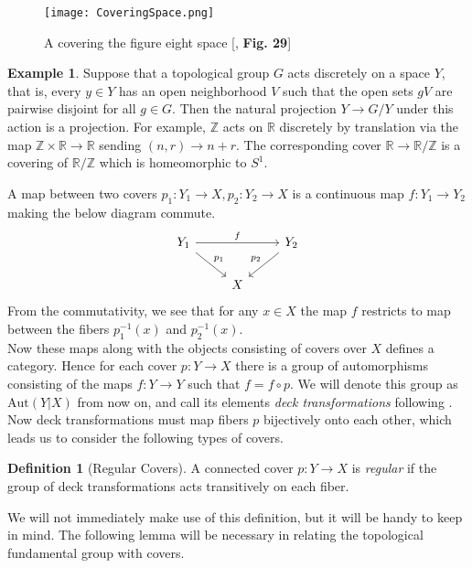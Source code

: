 \documentclass{article}
\theoremstyle{definition}
\newtheorem{definition}[theorem]{Definition}
\newtheorem{example}[theorem]{Example}
\theoremstyle{remark}
\theoremstyle{plain}
\newcommand{\R}{\mathbb{R}}
\newcommand{\Z}{\mathbb{Z}}
\begin{document}
\begin{figure}[ht!]
\centering
\texttt{[image: CoveringSpace.png]}

\caption*{A covering the figure eight space [\cite{FomenkoFuchs}, \textbf{Fig. 29}]}
\end{figure}

\begin{example} Suppose that a topological group $G$ acts discretely on a space $Y$, that is, every $y \in Y$ has an open neighborhood $V$ such that the open sets $gV$ are pairwise disjoint for all $g  \in G$.
	Then the natural projection $Y \to G/Y$ under this action is a projection.
	For example, $\Z$ acts on $\R$ discretely by translation via the map $\Z \times \R \to \R$ sending $(n,r) \to n+r$.
	The corresponding cover $\R \to \R/\Z$ is a covering of $\R/\Z$ which is homeomorphic to $S^1$.
\end{example}

\indent A map between two covers $p_1: Y_1 \to X, p_2: Y_2 \to X$ is a continuous map $f: Y_1 \to Y_2$ making the below diagram commute.
\[\begin{tikzcd}
	{Y_1} && {Y_2} \\
	& X
	\arrow["f", from=1-1, to=1-3]
	\arrow["{p_1}", from=1-1, to=2-2]
	\arrow["{p_2}"', from=1-3, to=2-2]
\end{tikzcd}\]
From the commutativity, we see that for any $x \in X$ the map $f$ restricts to map between the fibers $p_1^{-1}(x)$ and $p_2^{-1}(x)$.\\
\indent Now these maps along with the objects consisting of covers over $X$ defines a category.
Hence for each cover $p:Y \to X$ there is a group of automorphisms consisting of the maps $f: Y \to Y$ such that $f = f \circ p$.
We will denote this group as $\text{Aut}(Y|X)$ from now on, and call its elements \textit{deck transformations} following \cite{FomenkoFuchs}.
Now deck transformations must map fibers $p$ bijectively onto each other, which leads us to consider the following types of covers.

\begin{definition}[Regular Covers]
	A connected cover $p: Y \to X$ is \textit{regular} if the group of deck transformations acts transitively on each fiber.
\end{definition}

We will not immediately make use of this definition, but it will be handy to keep in mind.
The following lemma will be necessary in relating the topological fundamental group with covers.
\end{document}

